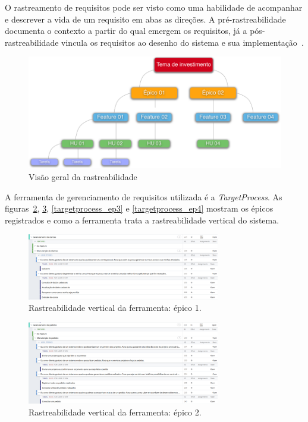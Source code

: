 O rastreamento de requisitos pode ser visto como uma habilidade de acompanhar e descrever a vida de um requisito em abas as direções. A pré-rastreabilidade documenta o contexto a partir do qual emergem os requisitos, já a pós-rastreabilidade vincula os requisitos ao desenho do sistema e sua implementação~\cite{davis}.

\begin{figure}[!htbp]
\centering
\includegraphics[scale=0.45]{figuras/matriz_rastreabilidade}
\caption[Visão geral da rastreabilidade]{Visão geral da rastreabilidade\footnotemark}
\label{Rastreabilidade}
\end{figure}

A ferramenta de gerenciamento de requisitos utilizada é a \textit{TargetProcess}. As figuras~\ref{targetprocess_ep1}, \ref{targetprocess_ep2}, \ref{targetprocess_ep3} e \ref{targetprocess_ep4} mostram os épicos registrados e como a ferramenta trata a rastreabilidade vertical do sistema.

\begin{figure}[!htbp]
\centering
\includegraphics[width=0.75\textwidth]{figuras/targetprocess_ep1}
\caption{Rastreabilidade vertical da ferramenta: épico 1.}
\label{targetprocess_ep1}
\end{figure}

\begin{figure}[!htbp]
\centering
\includegraphics[width=0.75\textwidth]{figuras/targetprocess_ep2}
\caption{Rastreabilidade vertical da ferramenta: épico 2.}
\label{targetprocess_ep2}
\end{figure}


